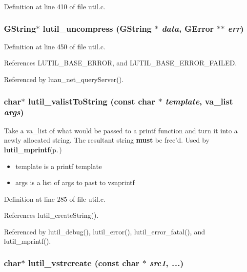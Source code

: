 Definition at line 410 of file util.c.
\subsubsection{\setlength{\rightskip}{0pt plus 5cm}GString$\ast$ lutil\_\-uncompress (GString $\ast$ {\em data}, GError $\ast$$\ast$ {\em err})}\label{util_8c_a15}




Definition at line 450 of file util.c.

References LUTIL\_\-BASE\_\-ERROR, and LUTIL\_\-BASE\_\-ERROR\_\-FAILED.

Referenced by luau\_\-net\_\-query\-Server().
\subsubsection{\setlength{\rightskip}{0pt plus 5cm}char$\ast$ lutil\_\-valist\-To\-String (const char $\ast$ {\em template}, va\_\-list {\em args})}\label{util_8c_a7}


Take a va\_\-list of what would be passed to a printf function and turn it into a newly allocated string. The resultant string {\bf must} be free'd. Used by {\bf lutil\_\-mprintf}{\rm (p.\,\pageref{util_8h_a14})}

\begin{itemize}
\item template is a printf template \item args is a list of args to past to vsnprintf 
\end{itemize}


Definition at line 285 of file util.c.

References lutil\_\-create\-String().

Referenced by lutil\_\-debug(), lutil\_\-error(), lutil\_\-error\_\-fatal(), and lutil\_\-mprintf().
\subsubsection{\setlength{\rightskip}{0pt plus 5cm}char$\ast$ lutil\_\-vstrcreate (const char $\ast$ {\em src1},  {\em ...})}\label{util_8c_a3}


